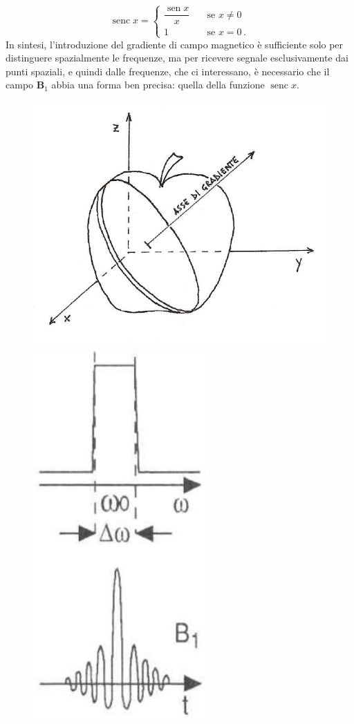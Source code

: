 \documentclass{report}
\numberwithin{equation}{section}
\numberwithin{figure}{section}
\DeclareMathOperator{\sen}{sen}
\DeclareMathOperator{\senc}{senc}
\renewcommand{\Vec}{\bm}
\begin{document}
\[ \senc{x} =
   \begin{cases}
    \dfrac{\sen{x}}{x} & \quad \text{se } x\neq0 \\
    1                          & \quad \text{se } x=0 \,.
   \end{cases}
\]
In sintesi, l'introduzione del gradiente di campo magnetico è sufficiente solo per distinguere spazialmente le frequenze, ma per ricevere segnale esclusivamente dai punti spaziali, e quindi dalle frequenze, che ci interessano, è necessario che il campo $\Vec{B}_1$ abbia una forma ben precisa: quella della funzione $\senc{x}$.

\begin{figure}[htp]
\centering
\includegraphics[scale=0.685]{immagini/mela.png}\quad\includegraphics[scale=0.6]{immagini/sinc.png}

\end{figure}
\end{document}
